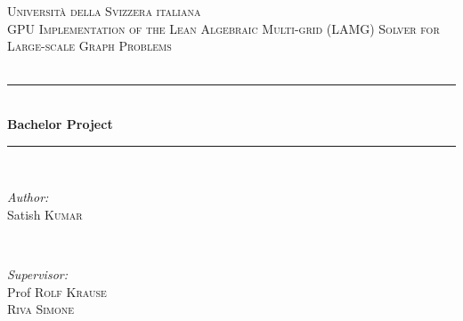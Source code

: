 \documentclass[a4paper, 8pt, oneside]{Thesis}  %
\begin{document}
\begin{titlepage}

\newcommand{\HRule}{\rule{\linewidth}{0.5mm}} %

\center %
 

\textsc{\LARGE Università della Svizzera italiana}\\[1.5cm] %
\textsc{\large GPU Implementation of the  Lean Algebraic Multi-grid (LAMG) Solver for Large-scale Graph Problems}\\[0.5cm] %
\textsc{ }\\[0.5cm] %


\HRule \\[0.4cm]
{ \huge \bfseries Bachelor Project}\\[0.4cm] %
\HRule \\[1.5cm]
 

\begin{minipage}{0.4\textwidth}
\begin{flushleft} \large
\emph{Author:}\\
Satish \textsc{Kumar} %
\end{flushleft}
\end{minipage}
~
\begin{minipage}{0.4\textwidth}
\begin{flushright} \large
\emph{Supervisor:} \\
Prof  \textsc{Rolf Krause}\\ %
\textsc{Riva Simone}
\end{flushright}
\end{minipage}\\[2cm]


\end{titlepage}
\end{document}
